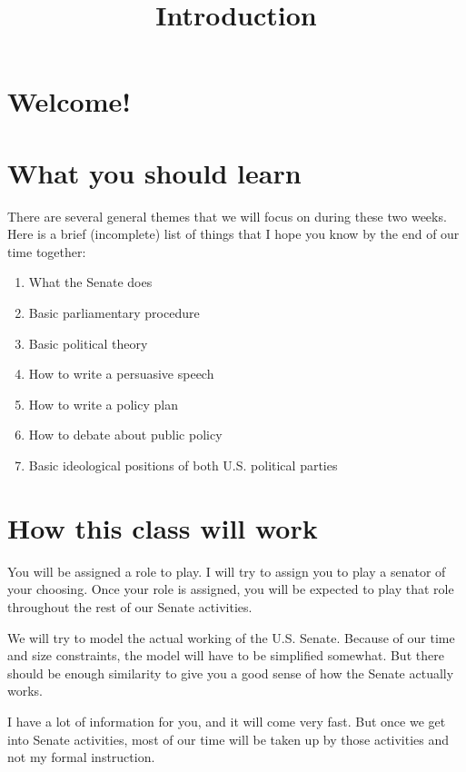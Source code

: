 \documentclass[,article,oneside,notitlepage]{memoir}
\title{Introduction}
\date{}
\begin{document}
\maketitle
\thispagestyle{senate}

\section{Welcome!}

\section{What you should learn}

There are several general themes that we will focus on during these two
weeks. Here is a brief (incomplete) list of things that I hope you know
by the end of our time together:

\begin{multicols}{2}
\begin{enumerate}
\item{What the Senate does}
\item{Basic parliamentary procedure}
\item{Basic political theory}
\item{How to write a persuasive speech}
\item{How to write a policy plan}
\item{How to debate about public policy}
\item{Basic ideological positions of both U.S. political parties}
\end{enumerate}
\end{multicols}

\section{How this class will work}

You will be assigned a role to play. I will try to assign you to play a
senator of your choosing. Once your role is assigned, you will be
expected to play that role throughout the rest of our Senate activities.

We will try to model the actual working of the U.S. Senate. Because of
our time and size constraints, the model will have to be simplified
somewhat. But there should be enough similarity to give you a good sense
of how the Senate actually works.

I have a lot of information for you, and it will come very fast. But
once we get into Senate activities, most of our time will be taken up by
those activities and not my formal instruction.
\end{document}
